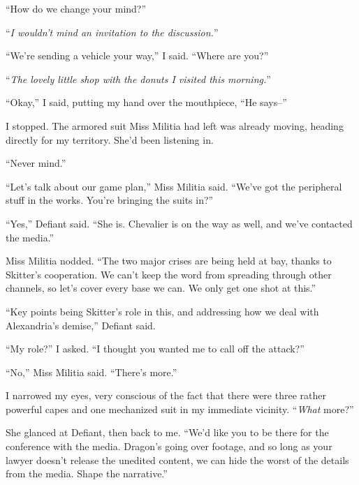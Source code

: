 ``How do we change your mind?''



``\emph{I wouldn't mind an invitation to the discussion.}''



``We're sending a vehicle your way,'' I said.  ``Where are you?''



``\emph{The lovely little shop with the donuts I visited this morning.}''



``Okay,'' I said, putting my hand over the mouthpiece, ``He says--''



I stopped.  The armored suit Miss Militia had left was already moving, heading directly for my territory.  She'd been listening in.



``Never mind.''



``Let's talk about our game plan,'' Miss Militia said.  ``We've got the peripheral stuff in the works.  You're bringing the suits in?''



``Yes,'' Defiant said.  ``She is.  Chevalier is on the way as well, and we've contacted the media.''



Miss Militia nodded.  ``The two major crises are being held at bay, thanks to Skitter's cooperation.  We can't keep the word from spreading through other channels, so let's cover every base we can.  We only get one shot at this.''



``Key points being Skitter's role in this, and addressing how we deal with Alexandria's demise,'' Defiant said.



``My role?'' I asked.  ``I thought you wanted me to call off the attack?''



``No,'' Miss Militia said.  ``There's more.''



I narrowed my eyes, very conscious of the fact that there were three rather powerful capes and one mechanized suit in my immediate vicinity.  ``\emph{What} more?''



She glanced at Defiant, then back to me.  ``We'd like you to be there for the conference with the media.  Dragon's going over footage, and so long as your lawyer doesn't release the unedited content, we can hide the worst of the details from the media.  Shape the narrative.''



